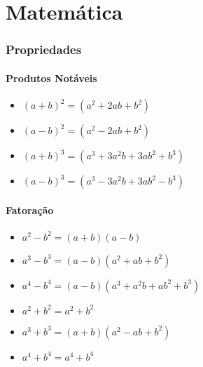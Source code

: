 \documentclass[12pt]{article}
\begin{document}

\tableofcontents

\newpage

\part{Matemática}

\section{Propriedades}

\subsection{Produtos Notáveis}

\begin{multicols}{2}
\begin{itemize}
\item $(a+b)^2 = (a^2+2ab+b^2)$
\item $(a-b)^2 = (a^2-2ab+b^2)$
\item $(a+b)^3 = (a^3+3a^2b+3ab^2+b^3)$
\item $(a-b)^3 = (a^3-3a^2b+3ab^2-b^3)$
\end{itemize}
\end{multicols}

\subsection{Fatoração}

\begin{multicols}{2}
\begin{itemize}
\item $a^2-b^2 = (a+b)(a-b)$
\item $a^3-b^3 = (a-b)(a^2+ab+b^2)$
\item $a^4-b^4 = (a-b)(a^3+a^2b+ab^2+b^3)$
\item $a^2+b^2 = a^2+b^2$
\item $a^3+b^3 = (a+b)(a^2-ab+b^2)$
\item $a^4+b^4 = a^4+b^4$
\end{itemize}
\end{multicols}
\end{document}

